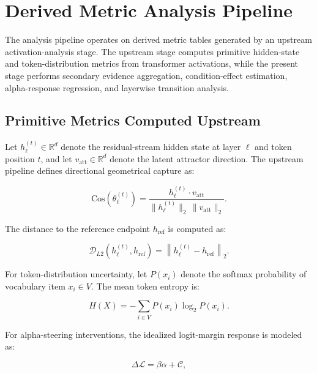 \section{Derived Metric Analysis Pipeline}
\label{sec:derived_metric_analysis}

The analysis pipeline operates on derived metric tables generated by an upstream activation-analysis stage. 
The upstream stage computes primitive hidden-state and token-distribution metrics from transformer activations, while the present stage performs secondary evidence aggregation, condition-effect estimation, alpha-response regression, and layerwise transition analysis.

\subsection{Primitive Metrics Computed Upstream}
\label{subsec:primitive_metrics}

Let $h_{\ell}^{(t)} \in \mathbb{R}^{d}$ denote the residual-stream hidden state at layer $\ell$ and token position $t$, and let $v_{\mathrm{att}} \in \mathbb{R}^{d}$ denote the latent attractor direction. 
The upstream pipeline defines directional geometrical capture as:

\begin{equation}
\mathrm{Cos}(\theta_{\ell}^{(t)})
=
\frac{
h_{\ell}^{(t)} \cdot v_{\mathrm{att}}
}{
\|h_{\ell}^{(t)}\|_2 \, \|v_{\mathrm{att}}\|_2
}.
\end{equation}

The distance to the reference endpoint $h_{\mathrm{ref}}$ is computed as:

\begin{equation}
\mathcal{D}_{L2}
\left(
h_{\ell}^{(t)}, h_{\mathrm{ref}}
\right)
=
\left\|
h_{\ell}^{(t)} - h_{\mathrm{ref}}
\right\|_2.
\end{equation}

For token-distribution uncertainty, let $P(x_i)$ denote the softmax probability of vocabulary item $x_i \in V$. 
The mean token entropy is:

\begin{equation}
H(X)
=
-
\sum_{i \in V}
P(x_i)
\log_2
P(x_i).
\end{equation}

For alpha-steering interventions, the idealized logit-margin response is modeled as:

\begin{equation}
\Delta \mathcal{L}
=
\beta \alpha + \mathcal{C},
\end{equation}

